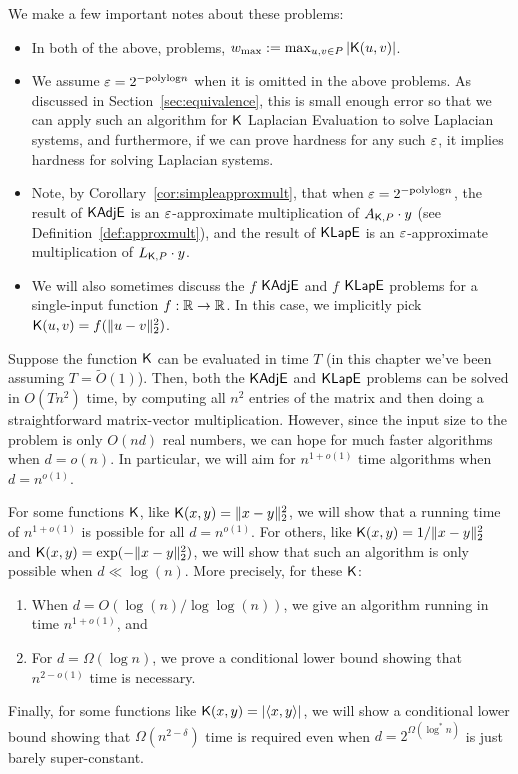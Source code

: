 We make a few important notes about these problems:
\begin{itemize}
    \item In both of the above, problems, $w_{\max} := \max_{u,v \in P} |\mathsf{K}(u,v)|$.
    \item We assume $\varepsilon = 2^{-\mathrm{polylog} n}$ when it is omitted in the above problems. As discussed in Section~\ref{sec:equivalence}, this is small enough error so that we can apply such an algorithm for $\mathsf{K}$ Laplacian Evaluation to solve Laplacian systems, and furthermore, if we can prove hardness for any such $\varepsilon$, it implies hardness for solving Laplacian systems.
    \item Note, by Corollary~\ref{cor:simpleapproxmult}, that when $\varepsilon = 2^{-\mathrm{polylog} n}$, the result of $\mathsf{KAdjE}$ is an $\varepsilon$-approximate multiplication of $A_{\mathsf{K},P} \cdot y$ (see Definition~\ref{def:approxmult}), and the result of $\mathsf{KLapE}$ is an $\varepsilon$-approximate multiplication of $L_{\mathsf{K},P} \cdot y$.
    \item We will also sometimes discuss the $f$ $\mathsf{KAdjE}$ and $f$ $\mathsf{KLapE}$ problems for a single-input function $f : {\mathbb R} \to {\mathbb R}$. In this case, we implicitly pick $\mathsf{K}(u,v) = f(\|u-v\|_2^2)$.
\end{itemize}
 

Suppose the function $\mathsf{K}$ can be evaluated in time $T$ (in this chapter we've been assuming $T = \tilde{O}(1)$). Then, both the $\mathsf{KAdjE}$  and $\mathsf{KLapE}$ problems can be solved in $O(T n^2)$ time, by computing all $n^2$ entries of the matrix and then doing a straightforward matrix-vector multiplication. However, since the input size to the problem is only $O(nd)$ real numbers, we can hope for much faster algorithms when $d = o(n)$. In particular, we will aim for $n^{1 + o(1)}$ time algorithms when $d = n^{o(1)}$.

For some functions $\mathsf{K}$, like $\mathsf{K}(x,y) = \| x - y \|_2^2$, we will show that a running time of $n^{1+o(1)}$ is possible for all $d = n^{o(1)}$. For others, like $\mathsf{K}(x,y) = 1/\|x - y\|_2^2$ and $\mathsf{K}(x,y) = \exp(-\|x - y\|_2^2)$, we will show that such an algorithm is only possible when $d \ll \log(n)$. More precisely, for these $\mathsf{K}$:
\begin{enumerate}
    \item When $d = O(\log (n) / \log \log (n))$, we give an algorithm running in time $n^{1 + o(1)}$, and
    \item For $d = \Omega(\log n)$, we prove a conditional lower bound showing that $n^{2 - o(1)}$ time is necessary. 
\end{enumerate}
Finally, for some functions like $\mathsf{K}(x,y) = |\langle x,y \rangle|$, we will show a conditional lower bound showing that $\Omega(n^{2-\delta})$ time is required even when $d = 2^{\Omega(\log^* n)}$ is just barely super-constant.


